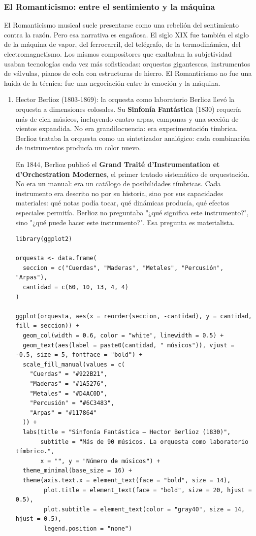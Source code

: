 \documentclass[14pt, a4paper]{article}
\begin{document}
\subsubsection{El Romanticismo: entre el sentimiento y la máquina}
\label{romanticismo}
El Romanticismo musical suele presentarse como una rebelión del
sentimiento contra la razón. Pero esa narrativa es engañosa. El siglo
XIX fue también el siglo de la máquina de vapor, del ferrocarril, del
telégrafo, de la termodinámica, del electromagnetismo. Los mismos
compositores que exaltaban la subjetividad usaban tecnologías cada vez
más sofisticadas: orquestas gigantescas, instrumentos de válvulas,
pianos de cola con estructuras de hierro. El Romanticismo no fue una
huida de la técnica: fue una negociación entre la emoción y la
máquina.
\begin{enumerate}
\item Hector Berlioz (1803-1869): la orquesta como laboratorio
\label{berlioz}
Berlioz llevó la orquesta a dimensiones colosales. Su \textbf{Sinfonía
Fantástica} (1830) requería más de cien músicos, incluyendo cuatro
arpas, campanas y una sección de vientos expandida. No era
grandilocuencia: era experimentación tímbrica. Berlioz trataba la
orquesta como un sintetizador analógico: cada combinación de
instrumentos producía un color nuevo.

En 1844, Berlioz publicó el \textbf{Grand Traité d'Instrumentation et
d'Orchestration Modernes}, el primer tratado sistemático de
orquestación. No era un manual: era un catálogo de posibilidades
tímbricas. Cada instrumento era descrito no por su historia, sino por
sus capacidades materiales: qué notas podía tocar, qué dinámicas
producía, qué efectos especiales permitía. Berlioz no preguntaba "¿qué
significa este instrumento?", sino "¿qué puede hacer este
instrumento?". Esa pregunta es materialista.

\begin{verbatim}
library(ggplot2)

orquesta <- data.frame(
  seccion = c("Cuerdas", "Maderas", "Metales", "Percusión", "Arpas"),
  cantidad = c(60, 10, 13, 4, 4)
)

ggplot(orquesta, aes(x = reorder(seccion, -cantidad), y = cantidad, fill = seccion)) +
  geom_col(width = 0.6, color = "white", linewidth = 0.5) +
  geom_text(aes(label = paste0(cantidad, " músicos")), vjust = -0.5, size = 5, fontface = "bold") +
  scale_fill_manual(values = c(
    "Cuerdas" = "#922B21",
    "Maderas" = "#1A5276", 
    "Metales" = "#D4AC0D",
    "Percusión" = "#6C3483",
    "Arpas" = "#117864"
  )) +
  labs(title = "Sinfonía Fantástica — Hector Berlioz (1830)",
       subtitle = "Más de 90 músicos. La orquesta como laboratorio tímbrico.",
       x = "", y = "Número de músicos") +
  theme_minimal(base_size = 16) +
  theme(axis.text.x = element_text(face = "bold", size = 14),
        plot.title = element_text(face = "bold", size = 20, hjust = 0.5),
        plot.subtitle = element_text(color = "gray40", size = 14, hjust = 0.5),
        legend.position = "none")
\end{verbatim}


\end{enumerate}
\end{document}
